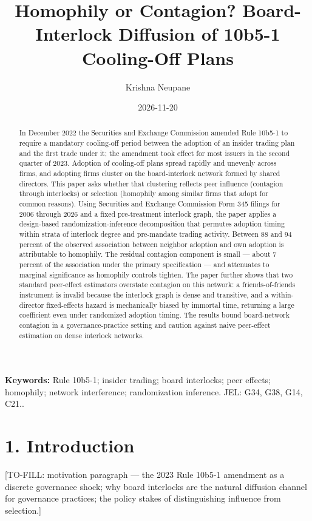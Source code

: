\documentclass[
  a4paper,
]{article}
\title{Homophily or Contagion? Board-Interlock Diffusion of 10b5-1
Cooling-Off Plans}
\author{Krishna Neupane}
\date{2026-11-20}
\begin{document}
\maketitle
\begin{abstract}
In December 2022 the Securities and Exchange Commission amended Rule
10b5-1 to require a mandatory cooling-off period between the adoption of
an insider trading plan and the first trade under it; the amendment took
effect for most issuers in the second quarter of 2023. Adoption of
cooling-off plans spread rapidly and unevenly across firms, and adopting
firms cluster on the board-interlock network formed by shared directors.
This paper asks whether that clustering reflects peer influence
(contagion through interlocks) or selection (homophily among similar
firms that adopt for common reasons). Using Securities and Exchange
Commission Form 345 filings for 2006 through 2026 and a fixed
pre-treatment interlock graph, the paper applies a design-based
randomization-inference decomposition that permutes adoption timing
within strata of interlock degree and pre-mandate trading activity.
Between 88 and 94 percent of the observed association between neighbor
adoption and own adoption is attributable to homophily. The residual
contagion component is small --- about 7 percent of the association
under the primary specification --- and attenuates to marginal
significance as homophily controls tighten. The paper further shows that
two standard peer-effect estimators overstate contagion on this network:
a friends-of-friends instrument is invalid because the interlock graph
is dense and transitive, and a within-director fixed-effects hazard is
mechanically biased by immortal time, returning a large coefficient even
under randomized adoption timing. The results bound board-network
contagion in a governance-practice setting and caution against naive
peer-effect estimation on dense interlock networks.
\end{abstract}


\noindent\textbf{Keywords:} Rule 10b5-1; insider trading; board
interlocks; peer effects; homophily; network interference; randomization
inference. JEL: G34, G38, G14, C21.. \vspace{1.5em}

\section{1. Introduction}\label{introduction}

{[}TO-FILL: motivation paragraph --- the 2023 Rule 10b5-1 amendment as a
discrete governance shock; why board interlocks are the natural
diffusion channel for governance practices; the policy stakes of
distinguishing influence from selection.{]}
\end{document}
